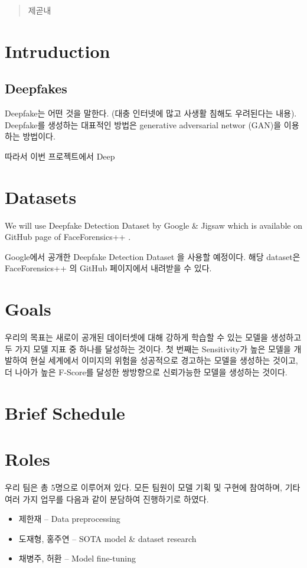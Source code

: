 \documentclass{article}
\begin{document}
\begin{abstract}
제곧내
\end{abstract}

\section{Intruduction}

\subsection{Deepfakes}

Deepfake는 어떤 것을 말한다. (대충 인터넷에 많고 사생활 침해도 우려된다는 내용). Deepfake를 생성하는 대표적인 방법은 generative adversarial networ (GAN)을 이용하는 방법이다.

따라서 이번 프로젝트에서 Deep

\section{Datasets}

We will use Deepfake Detection Dataset by Google \& Jigsaw \cite{DDD_GoogleJigSaw2019} which is available on GitHub page of FaceForensics++ \cite{roessler2019faceforensicspp}.

Google에서 공개한 Deepfake Detection Dataset \cite{DDD_GoogleJigSaw2019} 을 사용할 예정이다. 해당 dataset은 FaceForensics++ \cite{roessler2019faceforensicspp}의 GitHub 
페이지에서 내려받을 수 있다.

\section{Goals}

우리의 목표는 새로이 공개된 데이터셋에 대해 강하게 학습할 수 있는 모델을 생성하고 두 가지 모델 지표 중 하나를 달성하는 것이다. 첫 번째는 Sensitivity가 높은 모델을 개발하여 현실 세계에서 이미지의 위험을 성공적으로 경고하는 모델을 생성하는 것이고, 더 나아가 높은 F-Score를 달성한 쌍방향으로 신뢰가능한 모델을 생성하는 것이다.

\section{Brief Schedule}

\section{Roles}

우리 팀은 총 5명으로 이루어져 있다. 모든 팀원이 모델 기획 및 구현에 참여하며, 기타 여러 가지 업무를 다음과 같이 분담하여 진행하기로 하였다.
\begin{itemize}
	\item 제한재 -- Data preprocessing
	\item 도재형, 홍주연 -- SOTA model \& dataset research
	\item 채병주, 허환 -- Model fine-tuning
\end{itemize}
\end{document}
